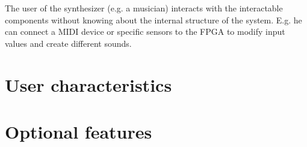 	The user of the synthesizer (e.g. a musician) interacts with the interactable components without knowing about the internal structure of the system. E.g. he can connect a MIDI device or specific sensors to the FPGA to modify input values and create different sounds. 
	\section{User characteristics}
	\section{Optional features}